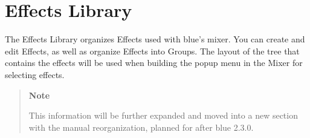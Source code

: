\section{Effects Library}\label{effectsLibrary}

The Effects Library organizes Effects used with blue's mixer. You can
create and edit Effects, as well as organize Effects into Groups. The
layout of the tree that contains the effects will be used when building
the popup menu in the Mixer for selecting effects.

\begin{quote}
\textbf{Note}

This information will be further expanded and moved into a new section
with the manual reorganization, planned for after blue 2.3.0.
\end{quote}

